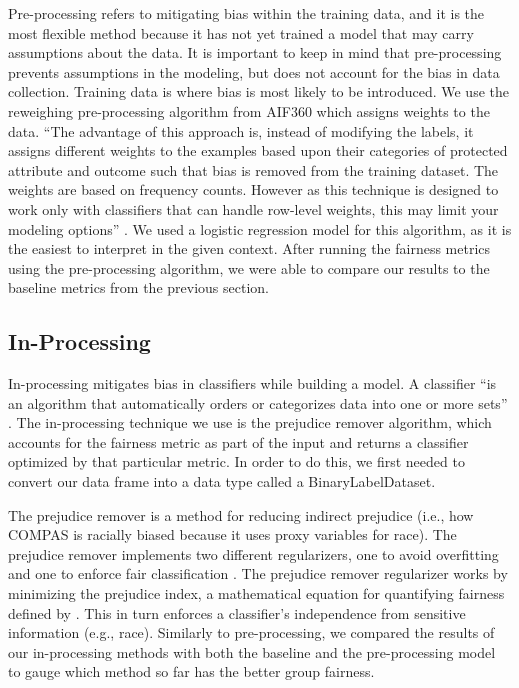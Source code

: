 \documentclass[water,article,submit,moreauthors,pdftex]{mdpi}
\begin{document}
Pre-processing refers to mitigating bias within the training data, and
it is the most flexible method because it has not yet trained a model
that may carry assumptions about the data. It is important to keep in
mind that pre-processing prevents assumptions in the modeling, but does
not account for the bias in data collection. Training data is where bias
is most likely to be introduced. We use the reweighing pre-processing
algorithm from AIF360 which assigns weights to the data. ``The advantage
of this approach is, instead of modifying the labels, it assigns
different weights to the examples based upon their categories of
protected attribute and outcome such that bias is removed from the
training dataset. The weights are based on frequency counts. However as
this technique is designed to work only with classifiers that can handle
row-level weights, this may limit your modeling options''
\citep{Ronaghan2019AI}. We used a logistic regression model for this
algorithm, as it is the easiest to interpret in the given context. After
running the fairness metrics using the pre-processing algorithm, we were
able to compare our results to the baseline metrics from the previous
section.

\hypertarget{in-processing}{%
\subsection{In-Processing}\label{in-processing}}

In-processing mitigates bias in classifiers while building a model. A
classifier ``is an algorithm that automatically orders or categorizes
data into one or more sets'' \citep{baxter2021AI}. The in-processing
technique we use is the prejudice remover algorithm, which accounts for
the fairness metric as part of the input and returns a classifier
optimized by that particular metric. In order to do this, we first
needed to convert our data frame into a data type called a
BinaryLabelDataset.

The prejudice remover is a method for reducing indirect prejudice (i.e.,
how COMPAS is racially biased because it uses proxy variables for race).
The prejudice remover implements two different regularizers, one to
avoid overfitting and one to enforce fair classification
\citep{kamishima2012fairness}. The prejudice remover regularizer works
by minimizing the prejudice index, a mathematical equation for
quantifying fairness defined by \citet{kamishima2012fairness}. This in
turn enforces a classifier's independence from sensitive information
(e.g., race). Similarly to pre-processing, we compared the results of
our in-processing methods with both the baseline and the pre-processing
model to gauge which method so far has the better group fairness.
\end{document}
